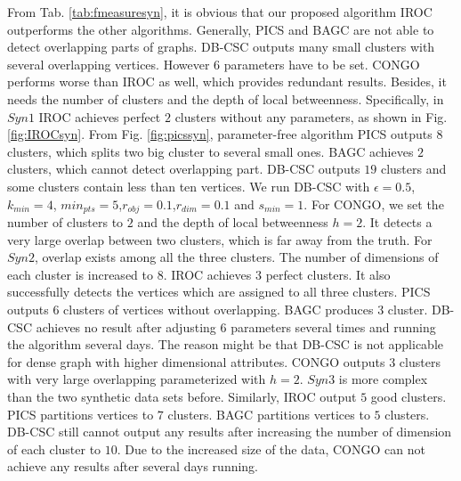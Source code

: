 From Tab. \ref{tab:fmeasuresyn}, it is obvious that our proposed algorithm IROC outperforms the other algorithms. Generally, PICS and BAGC are not able to detect overlapping parts of graphs. DB-CSC outputs many small clusters with several overlapping vertices. However $6$ parameters have to be set. CONGO performs worse than IROC as well, which provides redundant results. Besides, it needs the number of clusters and the depth of local betweenness. Specifically, in $Syn1$ IROC achieves perfect $2$ clusters without any parameters, as shown in Fig. {\ref{fig:IROCsyn}}. From Fig. {\ref{fig:picssyn}}, parameter-free algorithm PICS outputs $8$ clusters, which splits two big cluster to several small ones. BAGC achieves $2$ clusters, which cannot detect overlapping part. DB-CSC outputs $19$ clusters and some clusters contain less than ten vertices. We run DB-CSC with $\epsilon=0.5$, $k_{min}=4$, $min_{pts}=5$,$r_{obj}=0.1$,$r_{dim}=0.1$ and $s_{min}=1$. For CONGO, we set the number of clusters to $2$ and the depth of local betweenness $h=2$. It detects a very large overlap between two clusters, which is far away from the truth. For $Syn2$, overlap exists among all the three clusters. The number of dimensions of each cluster is increased to $8$. IROC achieves $3$ perfect clusters. It also successfully detects the vertices which are assigned to all three clusters. PICS outputs $6$ clusters of vertices without overlapping. BAGC produces $3$ cluster. DB-CSC achieves no result after adjusting $6$ parameters several times and running the algorithm several days. The reason might be that DB-CSC is not applicable for dense graph with higher dimensional attributes. CONGO outputs $3$ clusters with very large overlapping parameterized with $h = 2$. $Syn3$ is more complex than the two synthetic data sets before. Similarly, IROC output $5$ good clusters. PICS partitions vertices to $7$ clusters. BAGC partitions vertices to $5$ clusters. DB-CSC still cannot output any results after increasing the number of dimension of each cluster to $10$. Due to the increased size of the data, CONGO can not achieve any results after several days running. 

